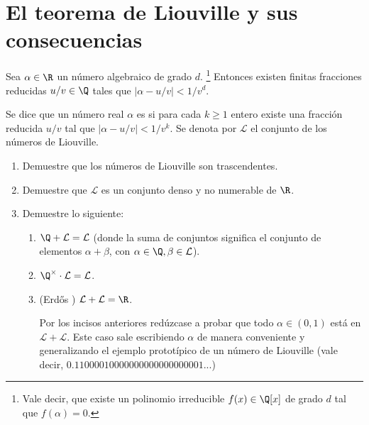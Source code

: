\documentclass[11pt, reqno]{amsart}
\begin{document}
\section{El teorema de Liouville y sus consecuencias}
\begin{thm}[Liouville]
	Sea $\alpha \in \R$ un número algebraico de grado $d$.%
	\footnote{Vale decir, que existe un polinomio irreducible $f(x) \in \Q[x]$ de grado $d$ tal que $f(\alpha) = 0$.}
	Entonces existen finitas fracciones reducidas $u/v \in \Q$ tales que $|\alpha - u/v| < 1/v^d$.
\end{thm}
\begin{mydef}
	Se dice que un número real $\alpha$ es  si para cada $k \ge 1$ entero existe una fracción reducida $u/v$
	tal que $|\alpha - u/v| < 1/v^k$.
	Se denota por $\mathcal{L}$ el conjunto de los números de Liouville.
\end{mydef}

\begin{enumerate}[resume]
	\item Demuestre que los números de Liouville son trascendentes.
	\item Demuestre que $\mathcal{L}$ es un conjunto denso y no numerable de $\R$.
	\item Demuestre lo siguiente:
		\begin{enumerate}
			\item $\Q + \mathcal{L} = \mathcal{L}$ (donde la suma de conjuntos significa el conjunto de elementos $\alpha + \beta$,
				con $\alpha \in \Q, \beta \in \mathcal{L}$).
			\item $\Q^\times \cdot \mathcal{L} = \mathcal{L}$.
			\item \hard
				(Erd\H os \cite{erdos62liouville}) $\mathcal{L + L} = \R$.

				\begin{hint}
					Por los incisos anteriores redúzcase a probar que todo $\alpha \in (0, 1)$ está en $\mathcal{L + L}$.
					Este caso sale escribiendo $\alpha$ de manera conveniente y generalizando el ejemplo prototípico
					de un número de Liouville (vale decir, $0.1100001 00000 00000 00000 0001...$)
				\end{hint}
		\end{enumerate}
\end{enumerate}
\end{document}

